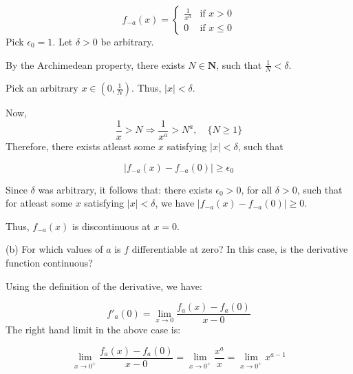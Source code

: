 \documentclass[10pt]{article}
\begin{document}
\begin{equation*}
f_{-a}( x) =\begin{cases}
\frac{1}{x^{a}} & \text{if } x >0\\
0 & \text{if } x\leq 0
\end{cases}
\end{equation*}
Pick $\displaystyle \epsilon _{0} =1$. Let $\displaystyle \delta  >0$ be arbitrary. 



By the Archimedean property, there exists $\displaystyle N\in \mathbf{N}$, such that $\displaystyle \frac{1}{N} < \delta $. 



Pick an arbitrary $\displaystyle x\in \left( 0,\frac{1}{N}\right)$. Thus, $\displaystyle |x|< \delta $. 



Now, 
\begin{equation*}
\frac{1}{x}  >N\Longrightarrow \frac{1}{x^{a}}  >N^{a} ,\quad \{N\geq 1\}
\end{equation*}
Therefore, there exists atleast some $\displaystyle x$ satisfying $\displaystyle |x|< \delta $, such that


\begin{equation*}
|f_{-a}( x) -f_{-a}( 0) |\geq \epsilon _{0}
\end{equation*}


Since $\displaystyle \delta $ was arbitrary, it follows that: there exists $\displaystyle \epsilon _{0}  >0$, for all $\displaystyle \delta  >0$, such that for atleast some $\displaystyle x$ satisfying $\displaystyle |x|< \delta $, we have $\displaystyle |f_{-a}( x) -f_{-a}( 0) |\geq 0$. 



Thus, $\displaystyle f_{-a}( x)$ is discontinuous at $\displaystyle x=0$.



(b) For which values of $\displaystyle a$ is $\displaystyle f$ differentiable at zero? In this case, is the derivative function continuous?



Using the definition of the derivative, we have:


\begin{equation*}
f'_{a}( 0) =\lim _{x\rightarrow 0}\frac{f_{a}( x) -f_{a}( 0)}{x-0}
\end{equation*}
The right hand limit in the above case is:


\begin{equation*}
\lim _{x\rightarrow 0^{+}}\frac{f_{a}( x) -f_{a}( 0)}{x-0} =\lim _{x\rightarrow 0^{+}}\frac{x^{a}}{x} =\lim _{x\rightarrow 0^{+}} x^{a-1}
\end{equation*}
\end{document}
